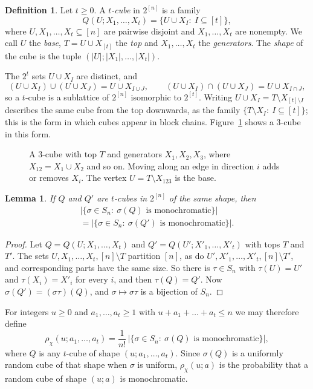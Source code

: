 \documentclass[11pt,reqno]{amsart}
\numberwithin{equation}{section}
\theoremstyle{plain}
\newtheorem{lemma}[theorem]{Lemma}
\theoremstyle{definition}
\newtheorem{definition}[theorem]{Definition}
\theoremstyle{remark}
\begin{document}
\begin{definition}
\label{def:cube}
Let $t\ge0$. A \emph{$t$-cube} in $2^{[n]}$ is a family
\[
Q(U;X_1,\dots,X_t)=\{U\cup X_I:\ I\subseteq[t]\},
\]
where $U,X_1,\dots,X_t\subseteq[n]$ are pairwise disjoint and
$X_1,\dots,X_t$ are nonempty. We call $U$ the \emph{base},
$T=U\cup X_{[t]}$ the \emph{top} and $X_1,\dots,X_t$ the
\emph{generators}. The \emph{shape} of the cube is the tuple
$(|U|;|X_1|,\dots,|X_t|)$.
\end{definition}

The $2^{t}$ sets $U\cup X_I$ are distinct, and
\[
(U\cup X_I)\cup(U\cup X_J)=U\cup X_{I\cup J},\qquad
(U\cup X_I)\cap(U\cup X_J)=U\cup X_{I\cap J},
\]
so a $t$-cube is a sublattice of $2^{[n]}$ isomorphic to $2^{[t]}$.
Writing $U\cup X_I=T\setminus X_{[t]\setminus I}$ describes the same
cube from the top downwards, as the family $\{T\setminus X_I:\
I\subseteq[t]\}$; this is the form in which cubes appear in block chains.
Figure~\ref{fig:holecube} shows a $3$-cube in this form.

\begin{figure}[t]
\centering

\caption{A $3$-cube with top $T$ and generators $X_1,X_2,X_3$, where
$X_{12}=X_1\cup X_2$ and so on. Moving along an edge in direction $i$
adds or removes $X_i$. The vertex $U=T\setminus X_{123}$ is the base.}
\label{fig:holecube}
\end{figure}

\begin{lemma}
\label{lem:shape}
If $Q$ and $Q'$ are $t$-cubes in $2^{[n]}$ of the same shape, then
\begin{multline*}
\bigl|\{\sigma\in S_n:\ \sigma(Q)\text{ is monochromatic}\}\bigr|\\
=\bigl|\{\sigma\in S_n:\ \sigma(Q')\text{ is monochromatic}\}\bigr| .
\end{multline*}
\end{lemma}

\begin{proof}
Let $Q=Q(U;X_1,\dots,X_t)$ and $Q'=Q(U';X'_1,\dots,X'_t)$ with tops $T$
and $T'$. The sets $U,X_1,\dots,X_t,[n]\setminus T$ partition $[n]$, as do
$U',X'_1,\dots,X'_t,[n]\setminus T'$, and corresponding parts have the
same size. So there is $\tau\in S_n$ with $\tau(U)=U'$ and
$\tau(X_i)=X'_i$ for every $i$, and then $\tau(Q)=Q'$. Now
$\sigma(Q')=(\sigma\tau)(Q)$, and $\sigma\mapsto\sigma\tau$ is a bijection
of $S_n$.
\end{proof}

For integers $u\ge0$ and $a_1,\dots,a_t\ge1$ with
$u+a_1+\dots+a_t\le n$ we may therefore define
\[
\rho_\chi(u;a_1,\dots,a_t)=\frac{1}{n!}\,
\bigl|\{\sigma\in S_n:\ \sigma(Q)\text{ is monochromatic}\}\bigr|,
\]
where $Q$ is any $t$-cube of shape $(u;a_1,\dots,a_t)$. Since $\sigma(Q)$
is a uniformly random cube of that shape when $\sigma$ is uniform,
$\rho_\chi(u;a)$ is the probability that a random cube of shape $(u;a)$ is
monochromatic.
\end{document}
